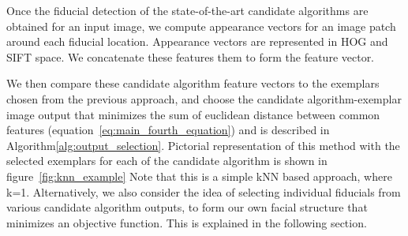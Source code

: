 Once the fiducial detection of the state-of-the-art candidate algorithms are obtained for
an input image, we compute appearance 
vectors for an image patch around each fiducial location. Appearance vectors are represented 
in HOG and SIFT space. 
We concatenate these features them to form the feature vector.

We then compare these candidate algorithm feature vectors 
to the exemplars chosen from the previous approach,
and choose the candidate algorithm-exemplar image output that minimizes the sum of
euclidean distance between common features (equation~\ref{eq:main_fourth_equation}) and is described in Algorithm\ref{alg:output_selection}. Pictorial
representation of this method with the selected exemplars for each of the candidate algorithm
is shown in figure~\ref{fig:knn_example}
Note that this is a simple kNN based approach,
where k=1. Alternatively, we also consider the idea of selecting individual fiducials
from various candidate algorithm outputs, to form our own facial structure that minimizes
an objective function. This is explained in the following section.


